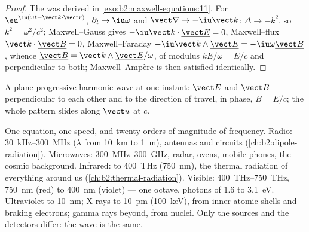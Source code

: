 \begin{proof}
The  was derived in \cref{exo:b2:maxwell-equations:11}.
For $\eu^{\iu(\omega t - \vect k\cdot\vect r)}$, $\partial_t \to \iu\omega$ and $\vect\nabla \to
-\iu\vect k$: $\Delta \to -k^2$, so $k^2 = \omega^2/c^2$; Maxwell--Gauss gives $-\iu
\vect k\cdot\underline{\vect E} = 0$, Maxwell--flux $\vect k\cdot\underline{\vect B} = 0$,
Maxwell--Faraday $-\iu\vect k\wedge\underline{\vect E} = -\iu\omega\underline{\vect B}$, whence
$\underline{\vect B} = \vect k\wedge\underline{\vect E}/\omega$, of modulus $kE/\omega = E/c$ and
perpendicular to both; Maxwell--Ampère is then satisfied identically.
\end{proof}

\begin{omfigure}

{\small A plane progressive harmonic wave at one instant: $\vect E$ and
$\vect B$ perpendicular to each other and to the direction of travel, in
phase, $B = E/c$; the whole pattern slides along $\vect u$ at $c$.}
\end{omfigure}

\begin{remark}\label{rem:b2:plane-waves-polarization:spectrum}
One equation, one speed, and twenty orders of magnitude of frequency.
Radio: \qty{30}{kHz}--\qty{300}{MHz} ($\lambda$ from \qty{10}{km} to \qty{1}{m}),
antennas and circuits (\cref{ch:b2:dipole-radiation}). Microwaves:
\qty{300}{MHz}--\qty{300}{GHz}, radar, ovens, mobile phones, the cosmic
background. Infrared: to \qty{400}{THz} (\qty{750}{nm}), the thermal
radiation of everything around us (\cref{ch:b2:thermal-radiation}).
Visible: \qty{400}{THz}--\qty{750}{THz}, \qty{750}{nm} (red) to \qty{400}{nm}
(violet) --- one octave, photons of $1.6$ to \qty{3.1}{eV}. Ultraviolet to
\qty{10}{nm}; X-rays to \qty{10}{pm} (\qty{100}{keV}), from inner atomic shells
and braking electrons; gamma rays beyond, from nuclei. Only the sources
and the detectors differ: the wave is the same.
\end{remark}

